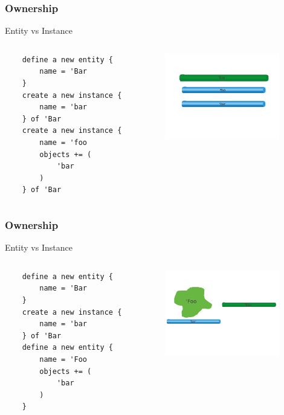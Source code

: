 \documentclass{beamer}
\begin{document}
\begin{frame}[fragile]
    \frametitle{Ownership}
    Entity vs Instance
    \begin{columns}[T]
    \begin{column}[T]{5cm}
    \begin{lstlisting}
    define a new entity {
        name = 'Bar
    }
    create a new instance {
        name = 'bar
    } of 'Bar
    create a new instance {
        name = 'foo
        objects += (
            'bar
        )
    } of 'Bar
    \end{lstlisting}
    \end{column}

    \begin{column}[T]{5cm}
    \includegraphics[width=5cm]{bar-owner}
    \end{column}
    \end{columns}
\end{frame}

\begin{frame}[fragile]
    \frametitle{Ownership}
    Entity vs Instance
    \begin{columns}[T]
    \begin{column}[T]{5cm}
    \begin{lstlisting}
    define a new entity {
        name = 'Bar
    }
    create a new instance {
        name = 'bar
    } of 'Bar
    define a new entity {
        name = 'Foo
        objects += (
            'bar
        )
    }
    \end{lstlisting}
    \end{column}

    \begin{column}[T]{5cm}
    \includegraphics[width=5cm]{foo-bar-owner}
    \end{column}
    \end{columns}
\end{frame}
\end{document}
